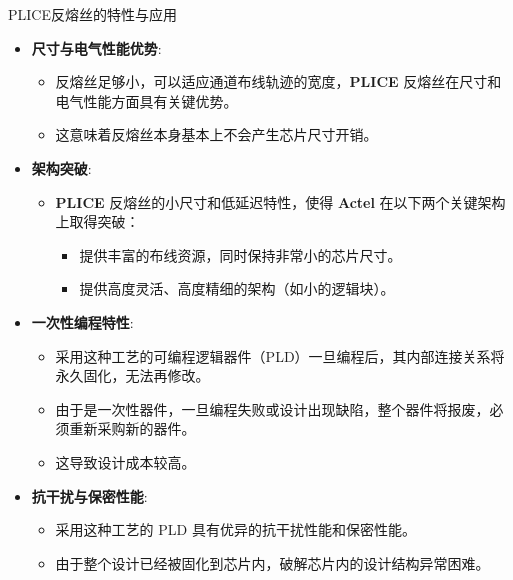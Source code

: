 \documentclass[
  ignorenonframetext,
  chinese,
]{beamer}
\providecommand{\tightlist}{%
  \setlength{\itemsep}{0pt}\setlength{\parskip}{0pt}}
\begin{document}
\begin{frame}
\begin{block}{PLICE反熔丝的特性与应用}
\label{pliceux53cdux7194ux4e1dux7684ux7279ux6027ux4e0eux5e94ux7528}
\begin{itemize}
\tightlist
\item
  \textbf{尺寸与电气性能优势}:

  \begin{itemize}
  \tightlist
  \item
    反熔丝足够小，可以适应通道布线轨迹的宽度，\textbf{PLICE}
    反熔丝在尺寸和电气性能方面具有关键优势。
  \item
    这意味着反熔丝本身基本上不会产生芯片尺寸开销。
  \end{itemize}
\item
  \textbf{架构突破}:

  \begin{itemize}
  \tightlist
  \item
    \textbf{PLICE} 反熔丝的小尺寸和低延迟特性，使得 \textbf{Actel}
    在以下两个关键架构上取得突破：

    \begin{itemize}
    \tightlist
    \item
      提供丰富的布线资源，同时保持非常小的芯片尺寸。
    \item
      提供高度灵活、高度精细的架构（如小的逻辑块）。
    \end{itemize}
  \end{itemize}
\item
  \textbf{一次性编程特性}:

  \begin{itemize}
  \tightlist
  \item
    采用这种工艺的可编程逻辑器件（PLD）一旦编程后，其内部连接关系将永久固化，无法再修改。
  \item
    由于是一次性器件，一旦编程失败或设计出现缺陷，整个器件将报废，必须重新采购新的器件。
  \item
    这导致设计成本较高。
  \end{itemize}
\item
  \textbf{抗干扰与保密性能}:

  \begin{itemize}
  \tightlist
  \item
    采用这种工艺的 PLD 具有优异的抗干扰性能和保密性能。
  \item
    由于整个设计已经被固化到芯片内，破解芯片内的设计结构异常困难。
  \end{itemize}
\end{itemize}
\end{block}
\end{frame}
\end{document}
